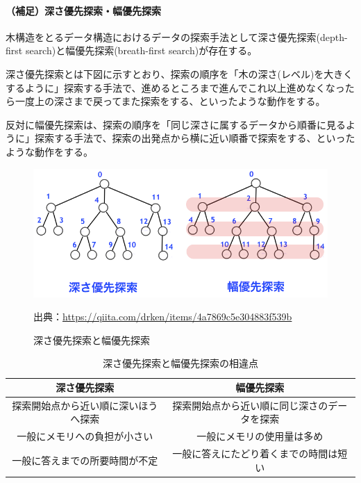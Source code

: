 \documentclass[dvipdfmx]{jsarticle}
\begin{document}
\paragraph{（補足）深さ優先探索・幅優先探索}
木構造をとるデータ構造におけるデータの探索手法として深さ優先探索(depth-first search)と幅優先探索(breath-first search)が存在する。\par
深さ優先探索とは下図に示すとおり、探索の順序を「木の深さ(レベル)を大きくするように」探索する手法で、進めるところまで進んでこれ以上進めなくなったら一度上の深さまで戻ってまた探索をする、といったような動作をする。\par
反対に幅優先探索は、探索の順序を「同じ深さに属するデータから順番に見るように」探索する手法で、探索の出発点から横に近い順番で探索をする、といったような動作をする。
\begin{figure}[H]
  \centering
  \includegraphics[scale=0.4]{images/hosoku.png}
  \caption{深さ優先探索と幅優先探索}
  出典：\url{https://qiita.com/drken/items/4a7869c5e304883f539b}
\end{figure}
\begin{table}[H]
  \begin{center}
    \caption{深さ優先探索と幅優先探索の相違点}
    \begin{tabular}{|c|c|} \hline
      深さ優先探索 & 幅優先探索 \\ \hline
    探索開始点から近い順に深いほうへ探索  & 探索開始点から近い順に同じ深さのデータを探索\\
    一般にメモリへの負担が小さい  & 一般にメモリの使用量は多め\\
    一般に答えまでの所要時間が不定  & 一般に答えにたどり着くまでの時間は短い\\ \hline
    \end{tabular}
    \label{hyo02}
  \end{center}
\end{table}
\end{document}
